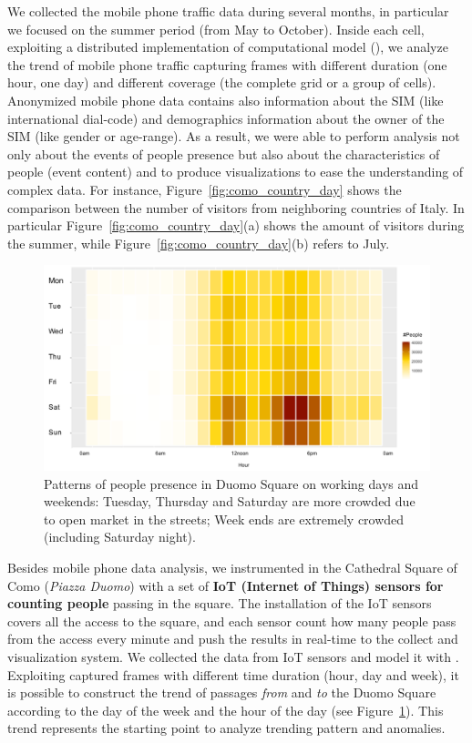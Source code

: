 {We collected the mobile phone traffic data during several months, in particular we focused on the summer period (from May to October). Inside each cell, exploiting a distributed implementation of \river{} computational model (\sparkdi{}), we analyze the trend of mobile phone traffic capturing \textsf{frame}s with different duration (one hour, one day) and different coverage (the complete grid or a group of cells). 
Anonymized mobile phone data contains also information about the SIM (like international dial-code) and demographics information about the owner of the SIM (like gender or age-range).
As a result, we were able to perform analysis not only about the \textsf{event}s of people presence but also about the characteristics of people (\textsf{event content}) and to produce visualizations to ease the understanding of complex data.
For instance, Figure~\ref{fig:como_country_day} shows the comparison between the number of visitors from neighboring countries of Italy.
In particular Figure~\ref{fig:como_country_day}(a) shows the amount of visitors during the summer, while Figure~\ref{fig:como_country_day}(b) refers to July.

\begin{figure} [t]
        \centering
        \includegraphics[width=.8\linewidth]{img/como-hourly-distribution}
        \caption{Patterns of people presence in Duomo Square on working days and weekends: Tuesday, Thursday and Saturday are more crowded due to open market in the streets; Week ends are extremely crowded (including Saturday night).}
        \label{fig:duomo}
\end{figure}

Besides mobile phone data analysis, we instrumented in the Cathedral Square of Como (\textit{Piazza Duomo}) with a set of \textbf{IoT (Internet of Things) sensors for counting people} passing in the square. The installation of the IoT sensors covers all the access to the square, and each sensor count how many people pass from the access every minute and push the results in real-time to the collect and visualization system.
We collected the data from IoT sensors and model it with \frappe{}.
Exploiting captured frames with different time duration (hour, day and week), it is possible to construct the trend of passages \emph{from} and \emph{to} the Duomo Square according to the day of the week and the hour of the day (see Figure~\ref{fig:duomo}). 
This trend represents the starting point to analyze trending pattern and anomalies. 

}
